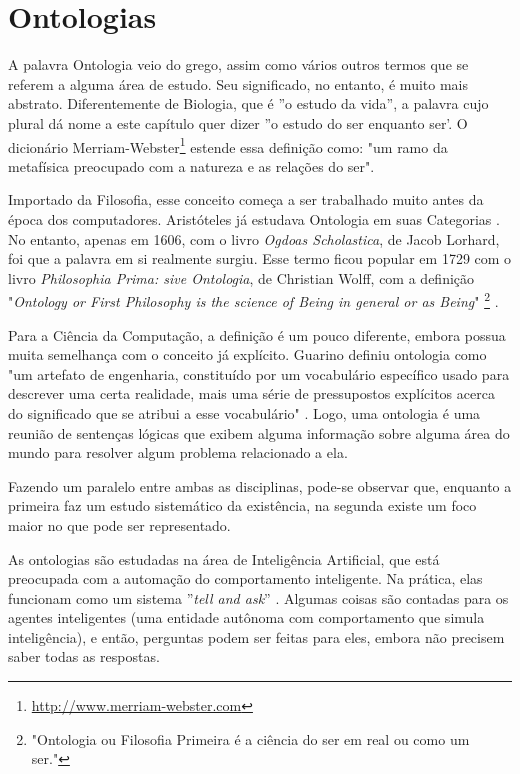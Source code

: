 \chapter{Ontologias}
\label{chap:ontologias}

\lettrine{A}{} palavra Ontologia veio do grego, assim como vários outros termos que se referem a alguma área de estudo. Seu significado, no entanto, é muito mais abstrato. Diferentemente de Biologia, que é ''o estudo da vida'', a palavra cujo plural dá nome a este capítulo quer dizer ''o estudo do ser enquanto ser'. O dicionário Merriam-Webster\footnote{\url{http://www.merriam-webster.com}} estende essa definição como: "um ramo da metafísica preocupado com a natureza e as relações do ser".

Importado da Filosofia, esse conceito começa a ser trabalhado muito antes da época dos computadores. Aristóteles já estudava Ontologia em suas Categorias \citep{ontoDahlberg}. No entanto, apenas em 1606, com o livro \textit{Ogdoas Scholastica}, de Jacob Lorhard, foi que a palavra em si realmente surgiu. Esse termo ficou popular em 1729 com o livro \textit{Philosophia Prima: sive Ontologia}, de Christian Wolff, com a definição "\textit{Ontology or First Philosophy is the science of Being in general or as Being}" \footnote{"Ontologia ou Filosofia Primeira é a ciência do ser em real ou como um ser."}  \citep{ontoNickles}.

Para a Ciência da Computação, a definição é um pouco diferente, embora possua muita semelhança com o conceito já explícito. Guarino definiu ontologia como "um artefato de engenharia, constituído por um vocabulário específico usado para descrever uma certa realidade, mais uma série de pressupostos explícitos acerca do significado que se atribui a esse vocabulário" \citep{ontoGuarino}. Logo, uma ontologia é uma reunião de sentenças lógicas que exibem alguma informação sobre alguma área do mundo para resolver algum problema relacionado a ela.

Fazendo um paralelo entre ambas as disciplinas, pode-se observar que, enquanto a primeira faz um estudo sistemático da existência, na segunda existe um foco maior no que pode ser representado.

As ontologias são estudadas na área de Inteligência Artificial, que está preocupada com a automação do comportamento inteligente. Na prática, elas funcionam como um sistema ''\textit{tell and ask}'' \citep{ontoRussel}. Algumas coisas são contadas para os agentes inteligentes (uma entidade autônoma com comportamento que simula inteligência), e então, perguntas podem ser feitas para eles, embora não precisem saber todas as respostas. 

